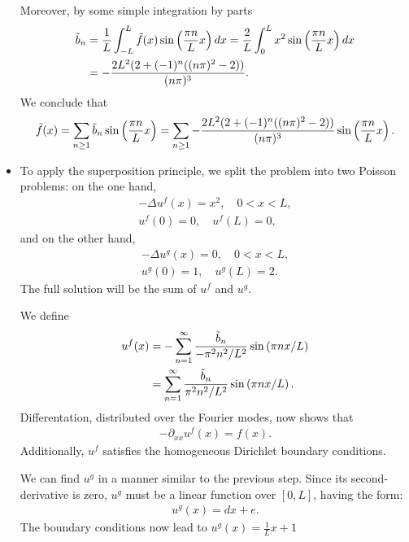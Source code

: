 \documentclass[11pt]{article}
\begin{document}
\begin{solution}
\begin{itemize}
        Moreover, by some simple integration by parts 
        \begin{align*}
            \Tilde{b}_n &= \frac{1}{L} \int_{-L}^L \Tilde{f}(x) \sin\left(\frac{\pi n}{L} x\right) dx = \frac{2}{L} \int_{0}^L x^2 \sin\left(\frac{\pi n}{L} x\right) dx\\
            &= -\frac{2 L^2 (2 + (-1)^n ((n \pi)^2 - 2))}{(n\pi)^3}.
        \end{align*}
        We conclude that
        \begin{align*}
            \Tilde{f}(x) = \sum_{n \geq 1} \Tilde{b}_n \sin\left(\frac{\pi n}{L} x\right) = \sum_{n \geq 1} -\frac{2 L^2 (2 + (-1)^n ((n \pi)^2 - 2))}{(n\pi)^3} \sin\left(\frac{\pi n}{L} x\right).
        \end{align*}
        \item 
        To apply the superposition principle, 
        we split the problem into two Poisson problems: on the one hand,
        \begin{gather*}
            - \Delta u^f(x) = x^2, \quad 0 < x < L,
            \\
            u^f(0) = 0, \quad u^f(L) = 0, 
        \end{gather*}
        and on the other hand, 
        \begin{gather*}
            - \Delta u^g(x) = 0, \quad 0 < x < L,
            \\
            u^g(0) = 1, \quad u^g(L) = 2.
        \end{gather*}
        The full solution will be the sum of $u^{f}$ and $u^{g}$.
        
        We define 
        \begin{align}
            u^{f}(x) 
            &
            = 
            - \sum_{n=1}^{\infty} \frac{\Tilde{b}_n}{ -\pi^{2} n^{2} / L^{2} } \sin\left( \pi n x / L \right)
            \\&
            = 
            \sum_{n=1}^{\infty} \frac{\Tilde{b}_n}{ \pi^{2} n^{2} / L^{2} } \sin\left( \pi n x / L \right)
            .
        \end{align}
        Differentation, distributed over the Fourier modes, now shows that 
        \begin{align}
            - \partial_{xx} u^{f}(x) = f(x).
        \end{align}
        Additionally, $u^{f}$ satisfies the homogeneous Dirichlet boundary conditions. 
        
        We can find $u^{g}$ in a manner similar to the previous step. 
        Since its second-derivative is zero, $u^{g}$ must be a linear function over $[0,L]$, having the form:
        \begin{align}
            u^{g}(x) = d x + e.
        \end{align}
        The boundary conditions now lead to $u^{g}(x) = \frac{1}{L} x + 1$
        

\end{itemize}
\end{solution}
\end{document}
